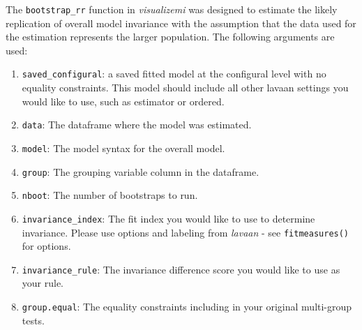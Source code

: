 \documentclass[
  man]{apa7}
\newenvironment{Shaded}{\begin{snugshade}}{\end{snugshade}}
\newcommand{\AttributeTok}[1]{\textcolor[rgb]{0.13,0.29,0.53}{#1}}
\newcommand{\CommentTok}[1]{\textcolor[rgb]{0.56,0.35,0.01}{\textit{#1}}}
\newcommand{\DecValTok}[1]{\textcolor[rgb]{0.00,0.00,0.81}{#1}}
\newcommand{\FunctionTok}[1]{\textcolor[rgb]{0.13,0.29,0.53}{\textbf{#1}}}
\newcommand{\NormalTok}[1]{#1}
\newcommand{\OtherTok}[1]{\textcolor[rgb]{0.56,0.35,0.01}{#1}}
\newcommand{\SpecialCharTok}[1]{\textcolor[rgb]{0.81,0.36,0.00}{\textbf{#1}}}
\newcommand{\StringTok}[1]{\textcolor[rgb]{0.31,0.60,0.02}{#1}}
\providecommand{\tightlist}{%
  \setlength{\itemsep}{0pt}\setlength{\parskip}{0pt}}
\begin{document}
The \texttt{bootstrap\_rr} function in \emph{visualizemi} was designed to estimate the likely replication of overall model invariance with the assumption that the data used for the estimation represents the larger population. The following arguments are used:

\begin{enumerate}
\def\labelenumi{\arabic{enumi})}
\tightlist
\item
  \texttt{saved\_configural}: a saved fitted model at the configural level with no equality constraints. This model should include all other lavaan settings you would like to use, such as estimator or ordered.
\item
  \texttt{data}: The dataframe where the model was estimated.
\item
  \texttt{model}: The model syntax for the overall model.
\item
  \texttt{group}: The grouping variable column in the dataframe.
\item
  \texttt{nboot}: The number of bootstraps to run.
\item
  \texttt{invariance\_index}: The fit index you would like to use to determine invariance. Please use options and labeling from \emph{lavaan} - see \texttt{fitmeasures()} for options.
\item
  \texttt{invariance\_rule}: The invariance difference score you would like to use as your rule.
\item
  \texttt{group.equal}: The equality constraints including in your original multi-group tests.
\end{enumerate}

\small

\begin{Shaded}
\end{Shaded}
\end{document}
